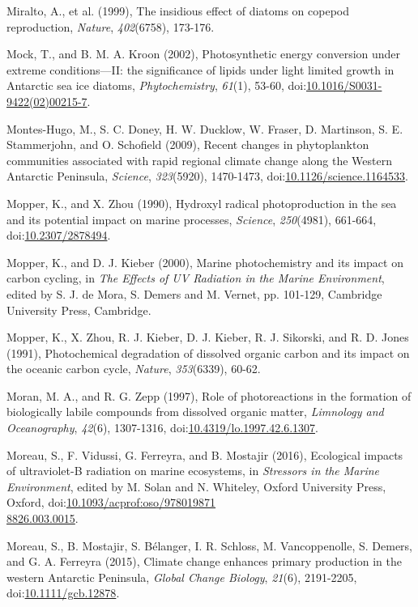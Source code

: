 \begin{singlespace}
{{Miralto, A., et al. (1999), The insidious effect of diatoms on copepod reproduction, \emph{Nature}, \emph{402}(6758), 173-176.

Mock, T., and B. M. A. Kroon (2002), Photosynthetic energy conversion under extreme conditions---II: the significance of lipids under light limited growth in Antarctic sea ice diatoms, \emph{Phytochemistry}, \emph{61}(1), 53-60, doi:\href{http://dx.doi.org/10.1016/S0031-9422(02)00215-7}{10.1016/S0031-9422(02)00215-7}.

Montes-Hugo, M., S. C. Doney, H. W. Ducklow, W. Fraser, D. Martinson, S. E. Stammerjohn, and O. Schofield (2009), Recent changes in phytoplankton communities associated with rapid regional climate change along the Western Antarctic Peninsula, \emph{Science}, \emph{323}(5920), 1470-1473, doi:\href{http://dx.doi.org/10.1126/science.1164533}{10.1126/science.1164533}.

Mopper, K., and X. Zhou (1990), Hydroxyl radical photoproduction in the sea and its potential impact on marine processes, \emph{Science}, \emph{250}(4981), 661-664, doi:\href{http://dx.doi.org/10.2307/2878494}{10.2307/2878494}.

Mopper, K., and D. J. Kieber (2000), Marine photochemistry and its impact on carbon cycling, in \emph{The Effects of UV Radiation in the Marine Environment}, edited by S. J. de Mora, S. Demers and M. Vernet, pp. 101-129, Cambridge University Press, Cambridge.

Mopper, K., X. Zhou, R. J. Kieber, D. J. Kieber, R. J. Sikorski, and R. D. Jones (1991), Photochemical degradation of dissolved organic carbon and its impact on the oceanic carbon cycle, \emph{Nature}, \emph{353}(6339), 60-62.

Moran, M. A., and R. G. Zepp (1997), Role of photoreactions in the formation of biologically labile compounds from dissolved organic matter, \emph{Limnology and Oceanography}, \emph{42}(6), 1307-1316, doi:\href{http://dx.doi.org/10.4319/lo.1997.42.6.1307}{10.4319/lo.1997.42.6.1307}.

Moreau, S., F. Vidussi, G. Ferreyra, and B. Mostajir (2016), Ecological impacts of ultraviolet-B radiation on marine ecosystems, in \emph{Stressors in the Marine Environment}, edited by M. Solan and N. Whiteley, Oxford University Press, Oxford, doi:\href{http://dx.doi.org/10.1093/acprof:oso/9780198718826.003.0015}{10.1093/acprof:oso/978019871\\8826.003.0015}.

Moreau, S., B. Mostajir, S. B\'{e}langer, I. R. Schloss, M. Vancoppenolle, S. Demers, and G. A. Ferreyra (2015), Climate change enhances primary production in the western Antarctic Peninsula, \emph{Global Change Biology}, \emph{21}(6), 2191-2205, doi:\href{http://dx.doi.org/10.1111/gcb.12878}{10.1111/gcb.12878}.

}}
\end{singlespace}
